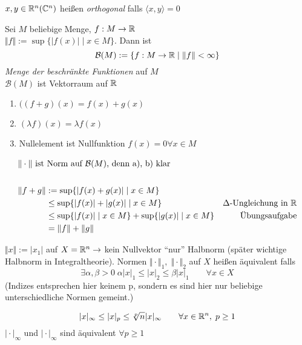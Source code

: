 \begin{mydefn}[Orthogonalität]
    $x,y \in \mathbb{R}^n(\mathbb{C}^n)$ heißen \emph{orthogonal} falls $\langle x,y\rangle =0$
\end{mydefn}

\begin{exmpn}
    Sei $M$ beliebige Menge, $f: M \to \mathbb{R}$\\
    $\Vert f\Vert:= \sup\{\vert f(x) \vert \mid x\in M\}$. Dann ist \\
    \[\mathcal{B}(M):= \{f: M \to \mathbb{R} \mid \Vert f\Vert < \infty\}\]
    \emph{Menge der beschränkte Funktionen} auf $M$\\
    $\mathcal{B}(M)$ ist Vektorraum auf $\mathbb{R}$
    \begin{enumerate}[label={\alph*)}]
        \item $((f+g)(x) = f(x) + g(x)$
        \item $(\lambda f)(x) = \lambda f(x)$
        \item Nullelement ist Nullfunktion $f(x)=0 \forall x \in M$
    \end{enumerate}
    \begin{align*}
        \shortintertext{$\Vert \cdot\Vert$ ist Norm auf $\mathcal{B}(M)$, denn a), b) klar}\\
        \Vert f+g\Vert&:=\sup\{\vert f(x)+g(x) \vert\mid x \in M\}&\\
        &\leq \sup\{\vert f(x) \vert + \vert g(x) \vert\mid x\in M \} & \Delta\text{-Ungleichung in }\mathbb{R}\\
        &\leq \sup\{\vert f(x) \vert\mid x \in M \} + \sup\{\vert g(x) \vert\mid x \in M \} & \text{Übungsaufgabe}\\
        &=\Vert f\Vert + \Vert g\Vert
    \end{align*}
\end{exmpn}

\begin{exmpn}
	$\Vert x \Vert:=\vert x_1 \vert$ auf $X=\mathbb{R}^n \to$ kein Nullvektor ``nur'' Halbnorm (später wichtige Halbnorm in Integraltheorie). Normen $\Vert \cdot \Vert_1,\;\Vert \cdot \Vert_2$ auf $X$ heißen äquivalent falls
    \[
    \exists \alpha,\beta > 0\;\alpha \vert x \vert_1 \leq \vert x \vert_2 \leq \beta\vert x \vert_1\qquad\forall x \in X
    \]
    (Indizes entsprechen hier keinem p, sondern es sind hier nur beliebige unterschiedliche Normen gemeint.)
\end{exmpn}

\begin{exmpn}
	\[
    \vert x \vert_{\infty} \leq \vert x \vert_p \leq \sqrt[p]{n}\vert x \vert_{\infty}\qquad \forall x \in \mathbb{R}^n,\;p\geq 1\\
    \]
    $\vert \cdot \vert_\infty$ und $\vert \cdot \vert_\infty$ sind äquivalent $\forall p \geq 1$
\end{exmpn}

